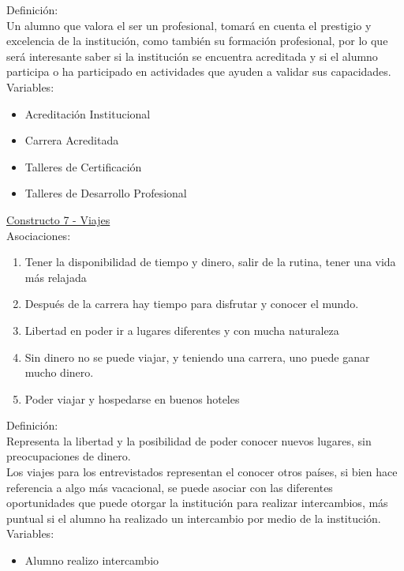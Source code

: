 Definición:\\
Un alumno que valora el ser un profesional, tomará en cuenta el prestigio y excelencia de la institución, como también su formación profesional, por lo que será interesante saber si la institución se encuentra acreditada y si el alumno participa o ha participado en actividades que ayuden a validar sus capacidades.\\

Variables:
\begin{itemize}
	\item Acreditación Institucional
	\item Carrera Acreditada
	\item Talleres de Certificación
	\item Talleres de Desarrollo Profesional	
\end{itemize} 


\underline {Constructo 7 - Viajes} \\
Asociaciones:
\begin{enumerate}
	\item Tener la disponibilidad de tiempo y dinero, salir de la rutina, tener una vida más relajada
	\item Después de la carrera hay tiempo para disfrutar y conocer el mundo. 
	\item Libertad en poder ir a lugares diferentes y con mucha naturaleza
	\item Sin dinero no se puede viajar, y teniendo una carrera, uno puede ganar mucho dinero.	
	\item Poder viajar y hospedarse en buenos hoteles
\end{enumerate}

Definición:\\
Representa la libertad y la posibilidad de poder conocer nuevos lugares, sin preocupaciones de dinero.\\

Los viajes para los entrevistados representan el conocer otros países, si bien hace referencia a algo más vacacional, se puede asociar con las diferentes oportunidades que puede otorgar la institución para realizar intercambios, más puntual si el alumno ha realizado un intercambio por medio de la institución.\\

Variables:
\begin{itemize}
	\item Alumno realizo intercambio
\end{itemize}



